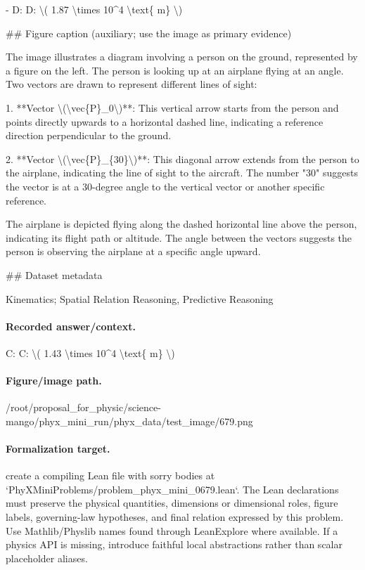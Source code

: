 - D: D: \textbackslash{}( 1.87 \textbackslash{}times 10\textasciicircum{}4 \textbackslash{}text\{ m\} \textbackslash{})

\#\# Figure caption (auxiliary; use the image as primary evidence)

The image illustrates a diagram involving a person on the ground, represented by a figure on the left. The person is looking up at an airplane flying at an angle. Two vectors are drawn to represent different lines of sight:

1. **Vector \textbackslash{}(\textbackslash{}vec\{P\}\_0\textbackslash{})**: This vertical arrow starts from the person and points directly upwards to a horizontal dashed line, indicating a reference direction perpendicular to the ground.

2. **Vector \textbackslash{}(\textbackslash{}vec\{P\}\_\{30\}\textbackslash{})**: This diagonal arrow extends from the person to the airplane, indicating the line of sight to the aircraft. The number "30" suggests the vector is at a 30-degree angle to the vertical vector or another specific reference.

The airplane is depicted flying along the dashed horizontal line above the person, indicating its flight path or altitude. The angle between the vectors suggests the person is observing the airplane at a specific angle upward.

\#\# Dataset metadata

Kinematics; Spatial Relation Reasoning, Predictive Reasoning

\paragraph{Recorded answer/context.}
C: C: \textbackslash{}( 1.43 \textbackslash{}times 10\textasciicircum{}4 \textbackslash{}text\{ m\} \textbackslash{})

\paragraph{Figure/image path.}
/root/proposal\_for\_physic/science-mango/phyx\_mini\_run/phyx\_data/test\_image/679.png

\paragraph{Formalization target.}
create a compiling Lean file with sorry bodies at `PhyXMiniProblems/problem\_phyx\_mini\_0679.lean`. The Lean declarations must preserve the physical quantities, dimensions or dimensional roles, figure labels, governing-law hypotheses, and final relation expressed by this problem.
Use Mathlib/Physlib names found through LeanExplore where available. If a physics API is missing, introduce faithful local abstractions rather than scalar placeholder aliases.

